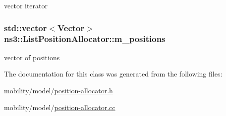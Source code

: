 vector iterator 

\subsubsection[{\texorpdfstring{m\+\_\+positions}{m_positions}}]{\setlength{\rightskip}{0pt plus 5cm}std\+::vector$<$Vector$>$ ns3\+::\+List\+Position\+Allocator\+::m\+\_\+positions\hspace{0.3cm}{\ttfamily [private]}}\hypertarget{classns3_1_1ListPositionAllocator_abd1f2d3efad6cf7baa19e756ddd017b2}{}\label{classns3_1_1ListPositionAllocator_abd1f2d3efad6cf7baa19e756ddd017b2}


vector of positions 



The documentation for this class was generated from the following files\+:\begin{DoxyCompactItemize}
\item 
mobility/model/\hyperlink{position-allocator_8h}{position-\/allocator.\+h}\item 
mobility/model/\hyperlink{position-allocator_8cc}{position-\/allocator.\+cc}\end{DoxyCompactItemize}
